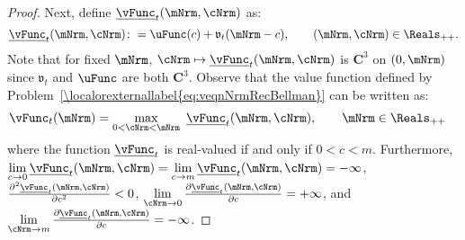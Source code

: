 \documentclass[\econtexRoot/BufferStockTheory]{subfiles}
\begin{document}
\begin{proof}
Next, define $\underline{\vFunc}_{t}(\mNrm,\cNrm)$ as:
%
%
\begin{equation*}
  \underline{\vFunc}_{t}(\mNrm,\cNrm)\colon =\uFunc(c)+\mathfrak{v}_{t}(\mNrm-c), \qquad (\mNrm,\cNrm)\in \Reals_{++}.
\end{equation*}
%
Note that for fixed $\mNrm$, $\cNrm \mapsto \underline{\vFunc}_{t}(\mNrm,\cNrm)$ is $\mathbf{C}^{3}$ on $(0, \mNrm)$ since $\mathfrak{v}_{t}$ and $\uFunc$ are both
$\mathbf{C}^{3}$. Observe that the value function defined
by Problem~\eqref{\localorexternallabel{eq:veqnNrmRecBellman}} can be written as:
%
\begin{equation*}\begin{gathered}\begin{aligned}
      \vFunc_{t}(\mNrm) & =  \max_{0<\cNrm<\mNrm}~\underline{\vFunc}_{t}(\mNrm,\cNrm), \qquad \mNrm\in \Reals_{++}
    \end{aligned}\end{gathered}\end{equation*}
%
where the function $\underline{\vFunc}_{t}$ is real-valued if and only if $0<c<m$.
Furthermore,
$\lim\limits_{c \rightarrow
  0}\underline{\vFunc}_{t}(\mNrm,\cNrm)=\lim\limits_{c\rightarrow m} \underline{\vFunc}_{t}(\mNrm,\cNrm)=-\infty $, $\frac{\partial ^{2}\underline{\vFunc}_{t}(\mNrm,\cNrm)}{\partial c^{2}}%
<0$, $\lim\limits_{\cNrm \rightarrow 0}\frac{\partial \underline{\vFunc}_{t}(\mNrm,\cNrm)}{\partial c}%
=+\infty $, and $\lim\limits_{\cNrm\rightarrow m} \frac{\partial \underline{\vFunc}_{t}(\mNrm,\cNrm)}{%
  \partial c}=-\infty $.


\end{proof}
\end{document}

